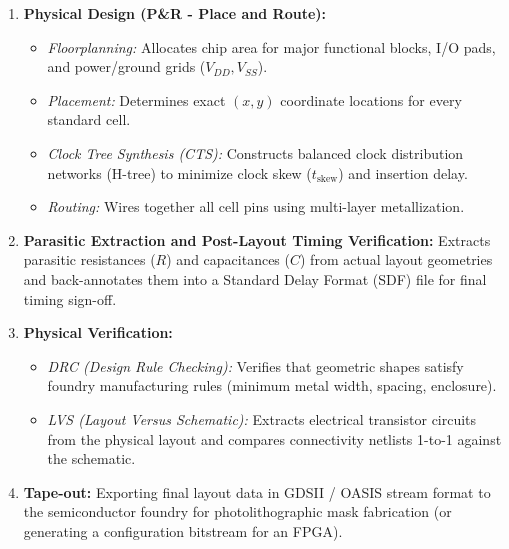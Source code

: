 \documentclass[12pt,a4paper]{article}
\begin{document}
\begin{enumerate}[label=\arabic*., leftmargin=*]
\begin{align}
      \text{Hold Time Constraint:} \quad & t_{cq} + t_{\text{comb}(\min)} \ge t_{\text{hold}} + t_{\text{skew}}
    \end{align}
  \item \textbf{Physical Design (P\&R - Place and Route):}
    \begin{itemize}
      \item \textit{Floorplanning:} Allocates chip area for major functional blocks, I/O pads, and power/ground grids ($V_{DD}, V_{SS}$).
      \item \textit{Placement:} Determines exact $(x, y)$ coordinate locations for every standard cell.
      \item \textit{Clock Tree Synthesis (CTS):} Constructs balanced clock distribution networks (H-tree) to minimize clock skew ($t_{\text{skew}}$) and insertion delay.
      \item \textit{Routing:} Wires together all cell pins using multi-layer metallization.
    \end{itemize}
  \item \textbf{Parasitic Extraction and Post-Layout Timing Verification:} Extracts parasitic resistances ($R$) and capacitances ($C$) from actual layout geometries and back-annotates them into a Standard Delay Format (SDF) file for final timing sign-off.
  \item \textbf{Physical Verification:}
    \begin{itemize}
      \item \textit{DRC (Design Rule Checking):} Verifies that geometric shapes satisfy foundry manufacturing rules (minimum metal width, spacing, enclosure).
      \item \textit{LVS (Layout Versus Schematic):} Extracts electrical transistor circuits from the physical layout and compares connectivity netlists 1-to-1 against the schematic.
    \end{itemize}
  \item \textbf{Tape-out:} Exporting final layout data in GDSII / OASIS stream format to the semiconductor foundry for photolithographic mask fabrication (or generating a configuration bitstream for an FPGA).
\end{enumerate}
\end{document}
